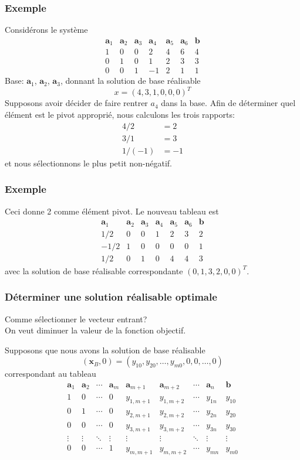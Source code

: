 \documentclass[t,usepdftitle=false]{beamer}
\def\ba{\boldsymbol{a}}
\def\bb{\boldsymbol{b}}
\def\bx{\boldsymbol{x}}
\begin{document}
\begin{frame}
\frametitle{Exemple}

Considérons le système
\[
\begin{matrix}
\ba_1 & \ba_2 & \ba_3 & \ba_4 & \ba_5 & \ba_6 & \bb \\
1 & 0 & 0 & 2 & 4 & 6 & 4 \\
0 & 1 & 0 & 1 & 2 & 3 & 3 \\
0 & 0 & 1 & -1 & 2 & 1 & 1
\end{matrix}
\]
Base: $\ba_1$, $\ba_2$, $\ba_3$, donnant la solution de base réalisable
\[
x = (4, 3, 1, 0, 0, 0)^T
\]
Supposons avoir décider de faire rentrer $a_4$ dans la base.
Afin de déterminer quel élément est le pivot approprié, nous calculons les trois rapports:
\begin{align*}
4/2 &= 2 \\
3/1 &= 3 \\
1/(-1) &= -1
\end{align*}
et nous sélectionnons le plus petit non-négatif.

\end{frame}

\begin{frame}
\frametitle{Exemple}

Ceci donne 2 comme élément pivot. Le nouveau tableau est
\[
\begin{matrix}
\ba_1 & \ba_2 & \ba_3 & \ba_4 & \ba_5 & \ba_6 & \bb \\
1/2 & 0 & 0 & 1 & 2 & 3 & 2 \\
-1/2 & 1 & 0 & 0 & 0 & 0 & 1 \\
1/2 & 0 & 1 & 0 & 4 & 4 & 3
\end{matrix}
\]
avec la solution de base réalisable correspondante
$(0, 1, 3, 2, 0, 0)^T$.

\end{frame}

\begin{frame}
\frametitle{Déterminer une solution réalisable optimale}

Comme sélectionner le vecteur entrant?\\
On veut diminuer la valeur de la fonction objectif.

\mbox{}

Supposons que nous avons la solution de base réalisable
\[
(\bx_B, 0) = (y_{10}, y_{20},\ldots,y_{m0},0,0,\ldots,0)
\]
correspondant au tableau
\[
\begin{matrix}
\ba_1 & \ba_2 & \cdots & \ba_m & \ba_{m+1} &
\ba_{m+2} & \cdots & \ba_n & \bb \\
1 & 0 & \cdots & 0 & y_{1,m+1} & y_{1,m+2} & \cdots & y_{1n} & y_{10} \\
0 & 1 & \cdots & 0 & y_{2,m+1} & y_{2,m+2} & \cdots & y_{2n} & y_{20} \\
0 & 0 & \cdots & 0 & y_{3,m+1} & y_{3,m+2} & \cdots & y_{3n} & y_{30} \\
\vdots & \vdots & \ddots & \vdots & \vdots & \vdots & \ddots & \vdots & \vdots \\
0 & 0 & \cdots & 1 & y_{m,m+1} & y_{m,m+2} & \cdots & y_{mn} & y_{m0}
\end{matrix}
\]
\end{frame}
\end{document}

